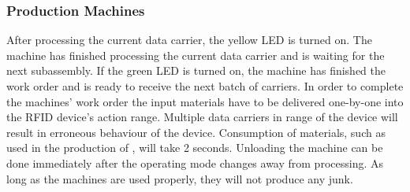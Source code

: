 \documentclass[12pt,twoside]{article}
\begin{document}
\subsubsection{Production Machines}
After processing the current data carrier, the yellow LED is turned
on.  The machine has finished processing the current data carrier and
is waiting for the next subassembly. If the green LED is turned on,
the machine has finished the work order and is ready to receive the
next batch of carriers. In order to complete the machines' work order
the input materials have to be delivered one-by-one into the RFID
device's action range. Multiple data carriers in range of the device
will result in erroneous behaviour of the device. Consumption of
materials, such as  used in the production of , will take 2
seconds. Unloading the machine can be done immediately after the
operating mode changes away from processing. As long as the machines
are used properly, they will not produce any junk.
\end{document}
